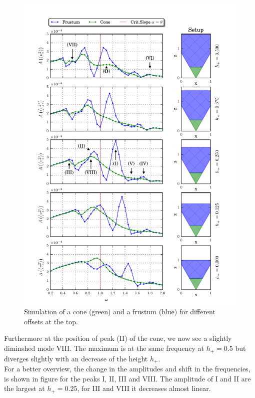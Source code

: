 \begin{figure}[!pt]
  \centering
  \includegraphics{gfx/cone/final/transition.pdf}
  \caption{
      \label{fig:cone:finaltransition}
    Simulation of a cone (green) and a frustum (blue) for different offsets at the
    top.
    }
\end{figure}
\clearpage

Furthermore at the position of peak (\RN{2}) of the cone, we now see a slightly diminshed mode \RN{8}.
The maximum is at the same frequency at $h_+=0.5$ but diverges slightly with an decrease of the height $h_+$.\\

For a better overview, the change in the amplitudes and shift in the frequencies, is shown in
figure \label{fig:cone:finalampmax} for the peaks \RN{1}, \RN{2}, \RN{3} and \RN{8}.
The amplitude of \RN{1} and \RN{2} are the largest at $h_+= 0.25$, for \RN{3} and \RN{8} it decreases almost linear.


